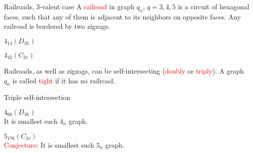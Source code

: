 \documentclass[%
pdf,
colorBG,
slideColor,
]{prosper}
\begin{document}
\begin{slide}{Railroads, $3$-valent case}
A \textcolor{red}{railroad} in graph $q_n$, $q=3, 4, 5$ is a circuit of hexagonal faces, such that any of them is adjacent to its neighbors on opposite faces. Any railroad is bordered by two zigzags.

\begin{center}
\begin{minipage}{5.5cm}
\centering
{}\par
$4_{14}(D_{3h})$
\end{minipage}
\begin{minipage}{5.5cm}
\centering
{}\par
$4_{42}(C_{2v})$
\end{minipage}
\end{center}

Railroads, as well as zigzags, can be self-intersecting (\textcolor{red}{doubly} or \textcolor{red}{triply}). A graph $q_n$ is called \textcolor{red}{tight} if it has no railroad.



\end{slide}





\begin{slide}{Triple self-intersection}

\begin{center}
\begin{minipage}{5.5cm}
\centering
{}\par
$4_{66}(D_{3h})$\\
It is smallest such $4_n$ graph.
\end{minipage}
\begin{minipage}{5.5cm}
\centering
{}\par
$5_{176}(C_{3v})$\\
\textcolor{red}{Conjecture:} It is smallest such $5_n$ graph.
\end{minipage}

\end{center}
\end{slide}
\end{document}
